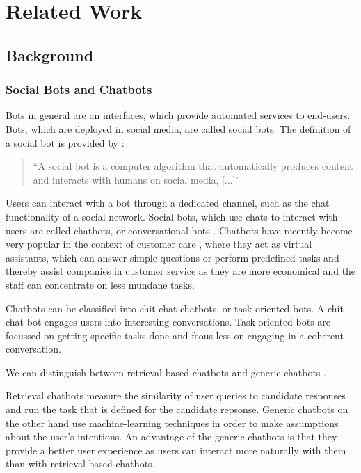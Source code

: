 \chapter{Related Work}

\section{Background}

\subsection{Social Bots and Chatbots}
Bots in general are an interfaces, which provide automated services to end-users. Bots, which are deployed in social media, are called social bots. The definition of a social bot is provided by \cite{FVD*16b}:
\begin{quote}
    ``A social bot is a computer algorithm that automatically produces content and interacts with humans on social media, [...]''
\end{quote}

Users can interact with a bot through a dedicated channel, such as the chat functionality of a social network. Social bots, which use chats to interact with users are called chatbots, or conversational bots \cite{WWX*16}. Chatbots have recently become very popular in the context of customer care \cite{CHW*17,FVD*16b}, where they act as virtual assistants, which can answer simple questions or perform predefined tasks and thereby assist companies in customer service as they are more economical and the staff can concentrate on less mundane tasks.

Chatbots can be classified into chit-chat chatbots, or task-oriented bots. A chit-chat bot engages users into interesting conversations. Task-oriented bots are focussed on getting specific tasks done and fcous less on engaging in a coherent conversation.

We can distinguish between retrieval based chatbots and generic chatbots \cite{NLKl19,WWX*16}.

Retrieval chatbots measure the similarity of user queries to candidate responses and run the task that is defined for the candidate repsonse. Generic chatbots on the other hand use machine-learning techniques in order to make assumptions about the user's intentions. An advantage of the generic chatbots is that they provide a better user experience as users can interact more naturally with them than with retrieval based chatbots.

